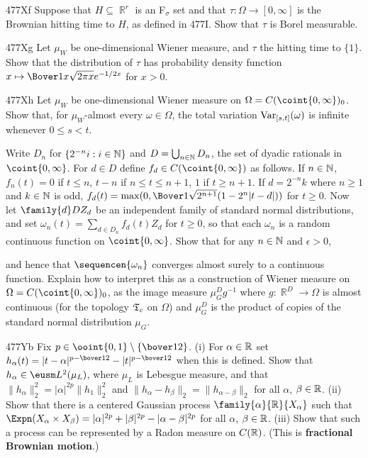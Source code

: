 {\spheader 477Xf Suppose that $H\subseteq\BbbR^r$ is an F$_{\sigma}$ set
and that $\tau:\Omega\to[0,\infty]$ is the Brownian hitting time to $H$,
as defined in 477I.   Show that $\tau$ is Borel measurable.

\spheader 477Xg Let $\mu_W$ be one-dimensional Wiener measure, and $\tau$
the hitting time to $\{1\}$.   Show that the distribution of
$\tau$ has probability density function
$x\mapsto\Bover1{x\sqrt{2\pi x}}e^{-1/2x}$ for $x>0$.

\spheader 477Xh Let $\mu_W$ be one-dimensional Wiener measure on
$\Omega=C(\coint{0,\infty})_0$.   Show that, for $\mu_W$-almost every
$\omega\in\Omega$, the total variation $\mathop{\text{Var}}_{[s,t]}(\omega)$ is infinite
whenever $0\le s<t$.

Write $D_n$ for
$\{2^{-n}i:i\in\Bbb N\}$ and $D=\bigcup_{n\in\Bbb N}D_n$,
the set of dyadic rationals in
$\coint{0,\infty}$.   For $d\in D$ define $f_d\in C(\coint{0,\infty})$
as follows.   If $n\in\Bbb N$, $f_n(t)=0$ if $t\le n$, $t-n$ if
$n\le t\le n+1$, $1$ if $t\ge n+1$.   If $d=2^{-n}k$ where $n\ge 1$ and
$k\in\Bbb N$ is
odd, $f_d(t)=\max(0,\Bover1{\sqrt{2^{n+1}}}(1-2^n|t-d|))$ for $t\ge 0$.
Now let $\family{d}D{Z_d}$ be an independent family of standard normal
distributions, and set $\omega_n(t)=\sum_{d\in D_n}f_d(t)Z_d$ for $t\ge 0$,
so that each $\omega_n$ is a random continuous function on
$\coint{0,\infty}$.   Show that for any $n\in\Bbb N$ and $\epsilon>0$,


\noindent and hence that $\sequencen{\omega_n}$ converges almost surely to a
continuous function.   Explain how to interpret this as a
construction of Wiener measure on $\Omega=C(\coint{0,\infty})_0$,
as the image measure $\mu_G^Dg^{-1}$ where $g:\BbbR^D\to\Omega$ is almost
continuous (for the topology $\frak T_c$ on $\Omega$) and $\mu_G^D$ is the
product of copies of the standard normal distribution $\mu_G$.

\spheader 477Yb
Fix $p\in\ooint{0,1}\setminus\{\bover12\}$.   (i) For $\alpha\in\Bbb R$ set
$h_{\alpha}(t)=|t-\alpha|^{p-\bover12}-|t|^{p-\bover12}$ when
this is defined.   Show that $h_{\alpha}\in\eusm L^2(\mu_L)$,
where $\mu_L$ is Lebesgue measure,
and that $\|h_{\alpha}\|^2_2=|\alpha|^{2p}\|h_1\|^2_2$ and
$\|h_{\alpha}-h_{\beta}\|_2=\|h_{\alpha-\beta}\|_2$ for all $\alpha$,
$\beta\in\Bbb R$.
(ii) Show that there is a centered Gaussian process
$\family{\alpha}{\Bbb R}{X_{\alpha}}$ such that
$\Expn(X_{\alpha}\times X_{\beta})
=|\alpha|^{2p}+|\beta|^{2p}-|\alpha-\beta|^{2p}$ for all $\alpha$,
$\beta\in\Bbb R$.
(iii) Show that such a process can be represented by a Radon measure on
$C(\Bbb R)$.      (This is {\bf fractional Brownian motion}.)

}
